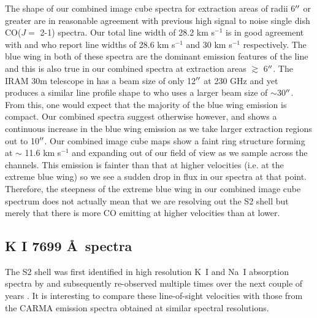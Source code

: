 \documentclass[preprint2]{aastex}
\begin{document}
The shape of our combined image cube spectra for extraction areas of radii 6$\mbox{$^{\prime\prime}$}$ or greater are in reasonable agreement with previous high signal to noise single dish CO($J=$ 2-1) spectra. Our total line width of 28.2 km s${}^{-1}$ is in good agreement with \cite{1987ApJ...313..400H} and \cite{1994ApJ...424L.127H} who report line widths of 28.6 km s${}^{-1}$ and 30 km s${}^{-1}$ respectively. The blue wing in both of these spectra are the dominant emission features of the line and this is also true in our combined spectra at extraction areas $\gtrsim$ 6$\mbox{$^{\prime\prime}$}$. The IRAM 30m telescope in \cite{1994ApJ...424L.127H} has a beam size of only 12$\mbox{$^{\prime\prime}$}$ at 230 GHz and yet produces a similar line profile shape to \cite{1987ApJ...313..400H} who uses a larger beam size of $\sim$30$\mbox{$^{\prime\prime}$}$. From this, one would expect that the majority of the blue wing emission is compact. Our combined spectra suggest otherwise however, and shows a continuous increase in the blue wing emission as we take larger extraction regions out to 10$\mbox{$^{\prime\prime}$}$. Our combined image cube maps show a faint ring structure forming at $\sim$ 11.6 km s${}^{-1}$ and expanding out of our field of view as we sample across the channels. This emission is fainter than that at higher velocities (i.e. at the extreme blue wing) so we see a sudden drop in flux in our spectra at that point. Therefore, the steepness of the extreme blue wing in our combined image cube spectrum does not actually mean that we are resolving out the S2 shell but merely that there is more CO emitting at higher velocities than at lower.

\subsection{K I 7699 \AA \ spectra}
The S2 shell was first identified in high resolution K~I and Na~I absorption spectra by \cite{1975ApJ...199..427G} and subsequently re-observed multiple times over the next couple of years \citep{1979QJRAS..20..361G}. It is interesting to compare these line-of-sight velocities with those from the CARMA emission spectra obtained at similar spectral resolutions.
\end{document}
